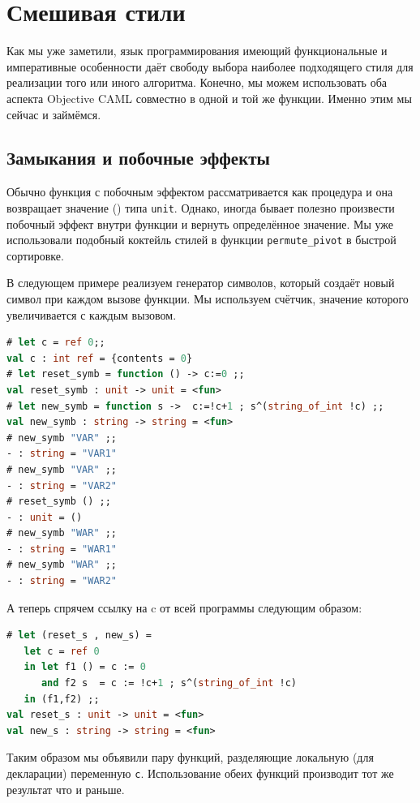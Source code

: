 \section{Смешивая стили}
\label{sec:mixing_styles}

Как мы уже заметили, язык программирования имеющий функциональные и
императивные особенности даёт свободу выбора наиболее подходящего стиля для
реализации того или иного алгоритма. Конечно, мы можем использовать оба аспекта
Objective CAML совместно в одной и той же функции. Именно этим мы сейчас и
займёмся.

\subsection{Замыкания и побочные эффекты}
\label{subsec:closures_and_side_effects}

Обычно функция с побочным эффектом рассматривается как процедура и она
возвращает значение () типа \texttt{unit}. Однако, иногда бывает полезно
произвести побочный эффект внутри функции и вернуть определённое значение. Мы
уже использовали подобный коктейль стилей в функции \texttt{permute\_pivot} в
быстрой сортировке.

В следующем примере реализуем генератор символов, который создаёт новый символ
при каждом вызове функции. Мы используем счётчик, значение которого
увеличивается с каждым вызовом.

\begin{lstlisting}[language=OCaml]
# let c = ref 0;;
val c : int ref = {contents = 0}
# let reset_symb = function () -> c:=0 ;;
val reset_symb : unit -> unit = <fun>
# let new_symb = function s ->  c:=!c+1 ; s^(string_of_int !c) ;;
val new_symb : string -> string = <fun>
# new_symb "VAR" ;;
- : string = "VAR1"
# new_symb "VAR" ;;
- : string = "VAR2"
# reset_symb () ;;
- : unit = ()
# new_symb "WAR" ;;
- : string = "WAR1"
# new_symb "WAR" ;;
- : string = "WAR2"
\end{lstlisting}

А теперь спрячем ссылку на c от всей программы следующим образом:

\begin{lstlisting}[language=OCaml]
# let (reset_s , new_s) =
   let c = ref 0
   in let f1 () = c := 0
      and f2 s  = c := !c+1 ; s^(string_of_int !c)
   in (f1,f2) ;;
val reset_s : unit -> unit = <fun>
val new_s : string -> string = <fun>
\end{lstlisting}

Таким образом мы объявили пару функций, разделяющие локальную (для декларации)
переменную \texttt{c}. Использование обеих функций производит тот же результат
что и раньше.

